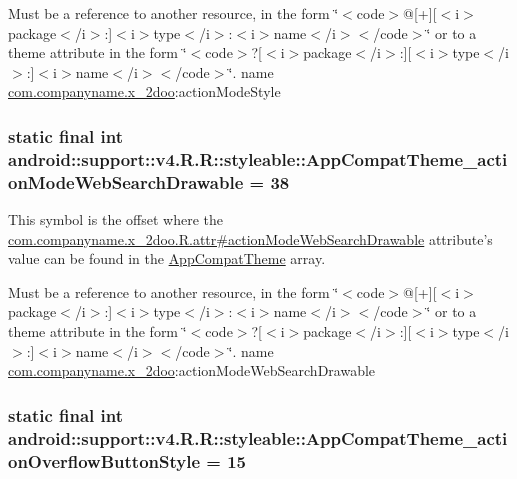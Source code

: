 Must be a reference to another resource, in the form \char`\"{}$<$code$>$@\mbox{[}+\mbox{]}\mbox{[}$<$i$>$package$<$/i$>$:\mbox{]}$<$i$>$type$<$/i$>$:$<$i$>$name$<$/i$>$$<$/code$>$\char`\"{} or to a theme attribute in the form \char`\"{}$<$code$>$?\mbox{[}$<$i$>$package$<$/i$>$:\mbox{]}\mbox{[}$<$i$>$type$<$/i$>$:\mbox{]}$<$i$>$name$<$/i$>$$<$/code$>$\char`\"{}.  name \hyperlink{namespacecom_1_1companyname_1_1x__2doo}{com.companyname.x\_\-2doo}:actionModeStyle \hypertarget{classandroid_1_1support_1_1v4_1_1_r_1_1styleable_bfa14a297ea509f8f84881a8e67711b1}{
\subsubsection[{AppCompatTheme\_\-actionModeWebSearchDrawable}]{\setlength{\rightskip}{0pt plus 5cm}static final int android::support::v4.R.R::styleable::AppCompatTheme\_\-actionModeWebSearchDrawable = 38}}
\label{classandroid_1_1support_1_1v4_1_1_r_1_1styleable_bfa14a297ea509f8f84881a8e67711b1}


This symbol is the offset where the \hyperlink{classcom_1_1companyname_1_1x__2doo_1_1_r_1_1attr_01c7f17f1c5edcb3f7cb0a957be4b754}{com.companyname.x\_\-2doo.R.attr\#actionModeWebSearchDrawable} attribute's value can be found in the \hyperlink{classandroid_1_1support_1_1v4_1_1_r_1_1styleable_0873e92ba21076bb5a4aeadeb7f5779f}{AppCompatTheme} array.

Must be a reference to another resource, in the form \char`\"{}$<$code$>$@\mbox{[}+\mbox{]}\mbox{[}$<$i$>$package$<$/i$>$:\mbox{]}$<$i$>$type$<$/i$>$:$<$i$>$name$<$/i$>$$<$/code$>$\char`\"{} or to a theme attribute in the form \char`\"{}$<$code$>$?\mbox{[}$<$i$>$package$<$/i$>$:\mbox{]}\mbox{[}$<$i$>$type$<$/i$>$:\mbox{]}$<$i$>$name$<$/i$>$$<$/code$>$\char`\"{}.  name \hyperlink{namespacecom_1_1companyname_1_1x__2doo}{com.companyname.x\_\-2doo}:actionModeWebSearchDrawable \hypertarget{classandroid_1_1support_1_1v4_1_1_r_1_1styleable_37abdbb58ba6784cee7b4db7074bb2d4}{
\subsubsection[{AppCompatTheme\_\-actionOverflowButtonStyle}]{\setlength{\rightskip}{0pt plus 5cm}static final int android::support::v4.R.R::styleable::AppCompatTheme\_\-actionOverflowButtonStyle = 15}}
\label{classandroid_1_1support_1_1v4_1_1_r_1_1styleable_37abdbb58ba6784cee7b4db7074bb2d4}


